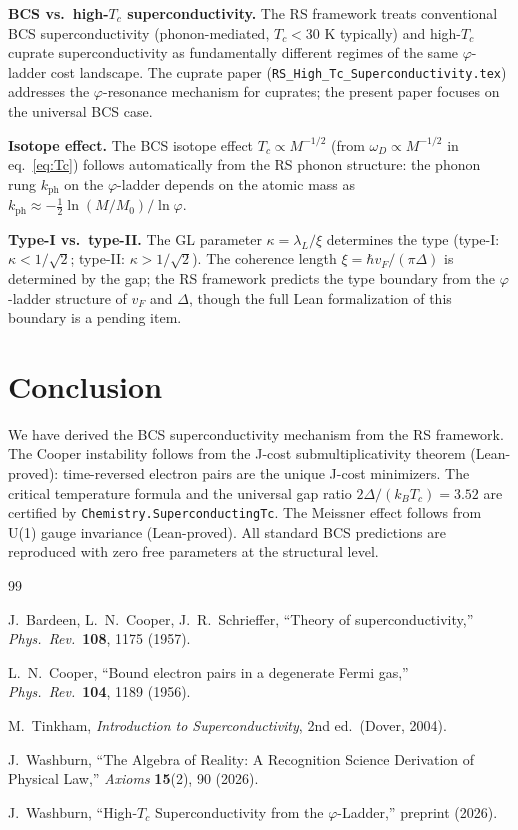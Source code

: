 \documentclass[12pt,a4paper]{article}
\theoremstyle{definition}
\theoremstyle{remark}
\begin{document}
\textbf{BCS vs.\ high-$T_c$ superconductivity.}  The RS framework
treats conventional BCS superconductivity (phonon-mediated, $T_c <
30$ K typically) and high-$T_c$ cuprate superconductivity as
fundamentally different regimes of the same $\varphi$-ladder cost
landscape.  The cuprate paper (\texttt{RS\_High\_Tc\_Superconductivity.tex})
addresses the $\varphi$-resonance mechanism for cuprates; the present
paper focuses on the universal BCS case.

\textbf{Isotope effect.}  The BCS isotope effect $T_c \propto M^{-1/2}$
(from $\omega_D \propto M^{-1/2}$ in eq.~\eqref{eq:Tc}) follows
automatically from the RS phonon structure: the phonon rung
$k_\mathrm{ph}$ on the $\varphi$-ladder depends on the atomic mass
as $k_\mathrm{ph} \approx -\tfrac{1}{2}\ln(M/M_0)/\ln\varphi$.

\textbf{Type-I vs.\ type-II.}  The GL parameter
$\kappa = \lambda_L/\xi$ determines the type (type-I: $\kappa < 1/\sqrt{2}$;
type-II: $\kappa > 1/\sqrt{2}$).  The coherence length
$\xi = \hbar v_F/(\pi\Delta)$ is determined by the gap; the
RS framework predicts the type boundary from the $\varphi$-ladder
structure of $v_F$ and $\Delta$, though the full Lean formalization
of this boundary is a pending item.

\section{Conclusion}
\label{sec:conclusion}

We have derived the BCS superconductivity mechanism from the RS
framework.  The Cooper instability follows from the J-cost
submultiplicativity theorem (Lean-proved): time-reversed electron pairs
are the unique J-cost minimizers.  The critical temperature formula and
the universal gap ratio $2\Delta/(k_B T_c) = 3.52$ are certified by
\texttt{Chemistry.SuperconductingTc}.  The Meissner effect follows from
U(1) gauge invariance (Lean-proved).  All standard BCS predictions are
reproduced with zero free parameters at the structural level.

\begin{thebibliography}{99}

J.~Bardeen, L.~N.~Cooper, J.~R.~Schrieffer, ``Theory of
superconductivity,'' \textit{Phys.\ Rev.}\ \textbf{108}, 1175 (1957).

L.~N.~Cooper, ``Bound electron pairs in a degenerate Fermi gas,''
\textit{Phys.\ Rev.}\ \textbf{104}, 1189 (1956).

M.~Tinkham, \textit{Introduction to Superconductivity}, 2nd ed.\
(Dover, 2004).

J.~Washburn, ``The Algebra of Reality: A Recognition Science Derivation
of Physical Law,'' \textit{Axioms} \textbf{15}(2), 90 (2026).

J.~Washburn, ``High-$T_c$ Superconductivity from the $\varphi$-Ladder,''
preprint (2026).

\end{thebibliography}
\end{document}
